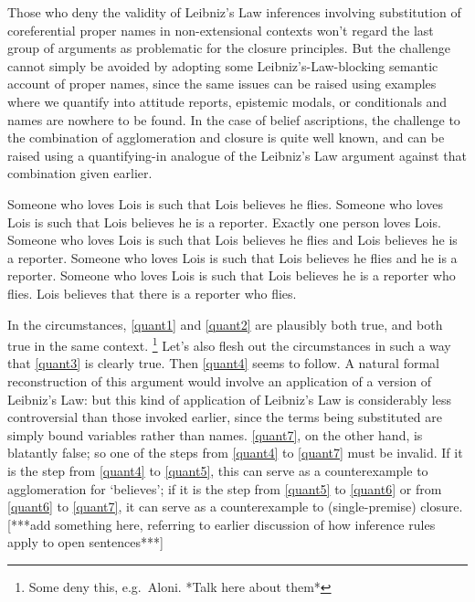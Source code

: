 \documentclass[If.tex]{subfiles}
\begin{document}
Those who deny the validity of Leibniz's Law inferences involving substitution of coreferential proper names in non-extensional contexts won't regard the last group of arguments as problematic for the closure principles.  But the challenge cannot simply be avoided by adopting some Leibniz's-Law-blocking semantic account of proper names, since the same issues can be raised using examples where we quantify into attitude reports, epistemic modals, or conditionals and names are nowhere to be found.  In the case of belief ascriptions, the challenge to the combination of agglomeration and closure is quite well known, and can be raised using a quantifying-in analogue of the Leibniz's Law argument against that combination given earlier.
\begin{prop}\nitem
	\begin{prop}
		\aitem \label{quant1}
		Someone who loves Lois is such that Lois believes he flies.
		\aitem \label{quant2}
		Someone who loves Lois is such that Lois believes he is a reporter.
		\aitem \label{quant3}
		Exactly one person loves Lois.
		\aitem \label{quant4}
		Someone who loves Lois is such that Lois believes he flies and Lois believes he is a reporter.
		\aitem \label{quant5}
		Someone who loves Lois is such that Lois believes he flies and he is a reporter.
		\aitem \label{quant6}
		Someone who loves Lois is such that Lois believes he is a reporter who flies.
		\aitem \label{quant7}
		Lois believes that there is a reporter who flies.
	\end{prop}
\end{prop}
In the circumstances, \ref{quant1} and \ref{quant2} are plausibly both true, and both true in the same context.%
\footnote{Some deny this, e.g.\ Aloni.  *Talk here about them*}
Let's also flesh out the circumstances in such a way that \ref{quant3} is clearly true.  Then \ref{quant4} seems to follow.  A natural formal reconstruction of this argument would involve an application of a version of Leibniz's Law: but this kind of application of Leibniz's Law is considerably less controversial than those invoked earlier, since the terms being substituted are simply bound variables rather than names.  \ref{quant7}, on the other hand, is blatantly false; so one of the steps from \ref{quant4} to \ref{quant7} must be invalid.  If it is the step from \ref{quant4} to \ref{quant5}, this can serve as a counterexample to agglomeration for ‘believes’; if it is the step from \ref{quant5} to \ref{quant6} or from \ref{quant6} to \ref{quant7}, it can serve as a counterexample to (single-premise) closure.  [***add something here, referring to earlier discussion of how inference rules apply to open sentences***]
\end{document}
